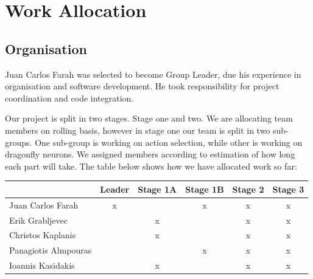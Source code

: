 \documentclass[a4paper,11pt]{article}
\begin{document}

\section{Work Allocation}


\subsection{Organisation}


Juan Carlos Farah was selected to become Group Leader, due his experience in organisation and software development. He took responsibility for project coordination and code integration.

Our project is split in two stages. Stage one and two. We are allocating team members on rolling basis, however in stage one our team is split in two sub-groups. One sub-group is working on action selection, while other is working on dragonfly neurons. We assigned members according to estimation of how long each part will take.
The table below shows how we have allocated work so far:

\begin{table}[ht]

\centering %

\begin{tabular}{l c c c c c} %


& Leader & Stage 1A & Stage 1B & Stage 2 & Stage 3\\ [0.5ex] %


\hline %

Juan Carlos Farah & x & & x & x & x \\ %

Erik Grabljevec & & x & & x & x \\

Christos Kaplanis & & x & & x & x \\

Panagiotis Almpouras & & & x & x & x \\

Ioannis Kasidakis & & x & & x & x \\ [1ex] %

\end{tabular}

\label{table:nonlin} %

\end{table}
\end{document}
